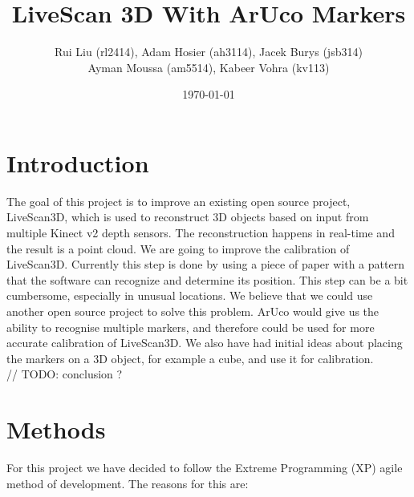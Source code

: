 \documentclass[a4paper,12pt]{article}
\title{LiveScan 3D With ArUco Markers}
\author{Rui Liu (rl2414), Adam Hosier (ah3114), Jacek Burys (jsb314)\\Ayman Moussa (am5514), Kabeer Vohra (kv113)}
\date{\today}
\begin{document}
\maketitle

\iffalse
The intent of this project is to introduce an improvement on an open source real time 3D reconstruction library, LiveScan3D (https://github.com/MarekKowalski/LiveScan3D).
LiveScan3D is a system designed for 3D reconstruction using multiple Kinect v2 depth sensors simultaneously in real time.
This library contains code for calibration of the relative postitions of different sensors. However, this part is a bit cumbersome.
The goal is to use another library, ArUco (http://www.uco.es/investiga/grupos/ava/node/26) to simplify, and potentually improve the accuracy of the calibration process. 
\fi

\section*{Introduction}

The goal of this project is to improve an existing open source project,
LiveScan3D, which is used to reconstruct 3D objects based on input from 
multiple Kinect v2 depth sensors. The reconstruction happens in real-time 
and the result is a point cloud. 
We are going to improve the calibration of LiveScan3D. Currently this step is
done by using a piece of paper with a pattern that the software can
recognize and determine its position. This step can be a bit cumbersome,
especially in unusual locations. 
We believe that we could use another open source project to solve this problem.
ArUco would give us the ability to recognise multiple markers, and therefore
could be used for more accurate calibration of LiveScan3D. We also have had
initial ideas about placing the markers on a 3D object, for example a cube,
and use it for calibration. \\
// TODO: conclusion ?

\section*{Methods}
For this project we have decided to follow the Extreme Programming (XP) agile method of development. The reasons for this are:
\end{document}
